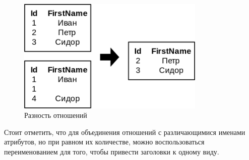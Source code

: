 \begin{itemize}
\begin{figure}[H]
		      \includegraphics[width=0.8\textwidth]{../assets/kgeorgiy/relalgebra/Set_Minus_2.svg.png}
		      \caption{Разность отношений}
		      \label{set-minus-ex}
	      \end{figure}
\end{itemize}

Стоит отметить, что для объединения отношений с различающимися именами атрибутов, но при равном их количестве, можно воспользоваться переименованием для того, чтобы привести заголовки к одному виду.
